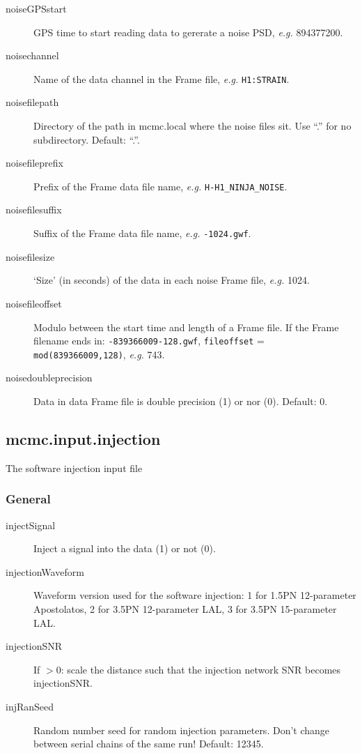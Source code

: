 \documentclass[10pt]{article}
\begin{document}
\begin{description}
\item[noiseGPSstart] GPS time to start reading data to gererate a noise PSD,  \textit{e.g.} 894377200.
\item[noisechannel] Name of the data channel in the Frame file, \textit{e.g.} \texttt{H1:STRAIN}.
\item[noisefilepath] Directory of the path in mcmc.local where the noise files sit.  Use ``.'' for no subdirectory.  Default: ``.''.
\item[noisefileprefix] Prefix of the Frame data file name, \textit{e.g.} \texttt{H-H1\_NINJA\_NOISE}.
\item[noisefilesuffix] Suffix of the Frame data file name, \textit{e.g.} \texttt{-1024.gwf}.
\item[noisefilesize] `Size' (in seconds) of the data in each noise Frame file,  \textit{e.g.} 1024.
\item[noisefileoffset]  Modulo between the start time and length of a Frame file.  If the Frame filename ends in: \texttt{-839366009-128.gwf}, \texttt{fileoffset} = \texttt{mod(839366009,128)},  \textit{e.g.} 743.
\item[noisedoubleprecision] Data in data Frame file is double precision (1) or nor (0).  Default: 0.
\end{description}






\pagebreak
\subsection{mcmc.input.injection}
The software injection input file


\subsubsection{General}
\begin{description}
\item[injectSignal] Inject a signal into the data (1) or not (0).
\item[injectionWaveform] Waveform version used for the software injection:  1 for 1.5PN 12-parameter Apostolatos, 2 for 3.5PN 12-parameter LAL, 3 for 3.5PN 15-parameter LAL.
\item[injectionSNR] If $>0$: scale the distance such that the injection network SNR becomes injectionSNR.
\item[injRanSeed] Random number seed for random injection parameters. Don't change between serial chains of the same run!  Default: 12345.
\end{description}
\end{document}
